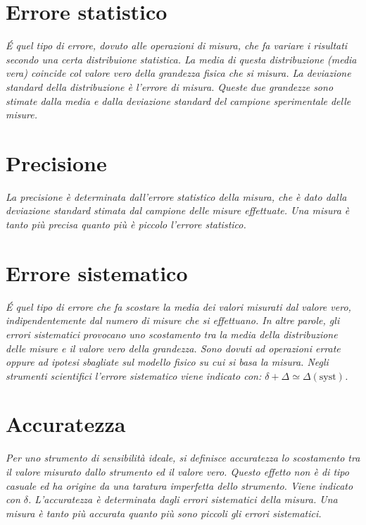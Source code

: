 \section{Errore statistico} %
\label{sec:errore-statistico}
\emph{\'E quel tipo di errore, dovuto alle operazioni di misura, che fa variare i risultati secondo una certa distribuione statistica. La media di questa distribuzione (media vera) coincide col valore vero della grandezza fisica che si misura. La deviazione standard della distribuzione è l'errore di misura. Queste due grandezze sono stimate dalla media e dalla deviazione standard del campione sperimentale delle misure.}

\section{Precisione} %
\label{sec:precisione}
\emph{La precisione è determinata dall'errore statistico della misura, che è dato dalla deviazione standard stimata dal campione delle misure effettuate. Una misura è tanto più precisa quanto più è piccolo l'errore statistico.}

\section{Errore sistematico} %
\label{sec:errore-sistematico}
\emph{\'E quel tipo di errore che fa scostare la media dei valori misurati dal valore vero, indipendentemente dal numero di misure che si effettuano. In altre parole, gli errori sistematici provocano uno scostamento tra la media della distribuzione delle misure e il valore vero della grandezza. Sono dovuti ad operazioni errate oppure ad ipotesi sbagliate sul modello fisico su cui si basa la misura. Negli strumenti scientifici l'errore sistematico viene indicato con: $\delta +\Delta \simeq \Delta \left( \textrm{syst} \right) $.}

\section{Accuratezza} %
\label{sec:accuratezza}
\emph{Per uno strumento di sensibilità ideale, si definisce accuratezza lo scostamento tra il valore misurato dallo strumento ed il valore vero. Questo effetto non è di tipo casuale ed ha origine da una taratura imperfetta dello strumento. Viene indicato con $\delta$. L'accuratezza è determinata dagli errori sistematici della misura. Una misura è tanto più accurata quanto più sono piccoli gli errori sistematici.}

